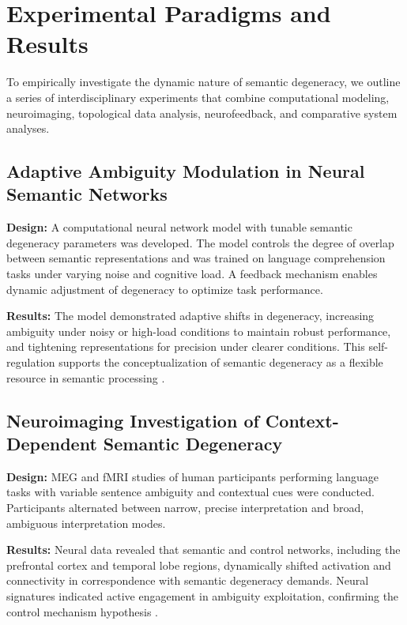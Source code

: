 \documentclass[12pt,a4paper]{article}
\begin{document}
\section{Experimental Paradigms and Results}

To empirically investigate the dynamic nature of semantic degeneracy, we outline a series of interdisciplinary experiments that combine computational modeling, neuroimaging, topological data analysis, neurofeedback, and comparative system analyses.

\subsection{Adaptive Ambiguity Modulation in Neural Semantic Networks}

\textbf{Design:} A computational neural network model with tunable semantic degeneracy parameters was developed. The model controls the degree of overlap between semantic representations and was trained on language comprehension tasks under varying noise and cognitive load. A feedback mechanism enables dynamic adjustment of degeneracy to optimize task performance.

\textbf{Results:} The model demonstrated adaptive shifts in degeneracy, increasing ambiguity under noisy or high-load conditions to maintain robust performance, and tightening representations for precision under clearer conditions. This self-regulation supports the conceptualization of semantic degeneracy as a flexible resource in semantic processing \cite{citation_needed}.

\subsection{Neuroimaging Investigation of Context-Dependent Semantic Degeneracy}

\textbf{Design:} MEG and fMRI studies of human participants performing language tasks with variable sentence ambiguity and contextual cues were conducted. Participants alternated between narrow, precise interpretation and broad, ambiguous interpretation modes.

\textbf{Results:} Neural data revealed that semantic and control networks, including the prefrontal cortex and temporal lobe regions, dynamically shifted activation and connectivity in correspondence with semantic degeneracy demands. Neural signatures indicated active engagement in ambiguity exploitation, confirming the control mechanism hypothesis \cite{citation_needed}.
\end{document}
